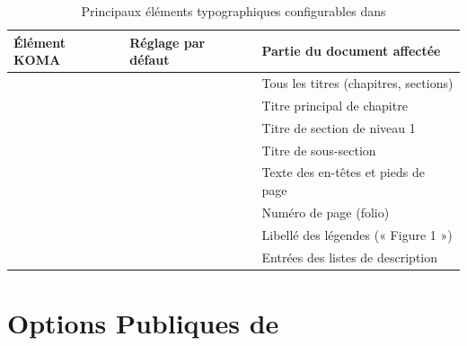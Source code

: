 \begin{table}[htbp]
  \centering
  \footnotesize
  \caption{Principaux éléments typographiques configurables dans }
  \label{tab:koma-elements}
  \begin{tabularx}{\textwidth}{@{} l L{6.2cm} Y @{}}
    \toprule
    \textbf{Élément KOMA} & \textbf{Réglage par défaut} & \textbf{Partie du document affectée} \\
    \midrule
          &  & Tous les titres (chapitres, sections) \\
              &                    & Titre principal de chapitre \\
              &                   & Titre de section de niveau 1 \\
           &  & Titre de sous-section \\
         &  & Texte des en-têtes et pieds de page \\
           &            & Numéro de page (folio) \\
         &  & Libellé des légendes (« Figure 1 ») \\
     &  & Entrées des listes de description \\
    \bottomrule
  \end{tabularx}
\end{table}

\clearpage

\section{Options Publiques de }
\label{sec:options-classe}

